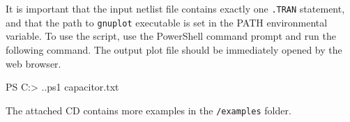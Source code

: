 It is important that the input netlist file contains exactly one \texttt{.TRAN} statement, and that the path to \texttt{gnuplot} executable is set in the PATH environmental variable. To use the script, use the PowerShell command prompt and run the following command. The output plot file should be immediately opened by the web browser.

\begin{code}
PS C:\NextGenSpice> .\plot.ps1 capacitor.txt
\end{code}

The attached CD contains more examples in the \texttt{/examples} folder.